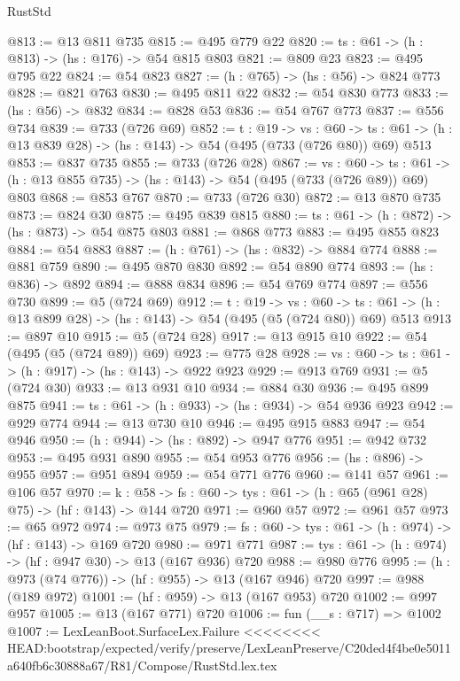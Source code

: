 \begin{lexlean}{RustStd}
\begin{coremodule}
{\begin{coremodule}
{{{{{@813 := @13 @811 @735
@815 := @495 @779 @22
@820 := {ts : @61} -> (h : @813) -> (hs : @176) -> @54 @815 @803
@821 := @809 @23
@823 := @495 @795 @22
@824 := @54 @823
@827 := (h : @765) -> (hs : @56) -> @824 @773
@828 := @821 @763
@830 := @495 @811 @22
@832 := @54 @830 @773
@833 := (hs : @56) -> @832
@834 := @828 @53
@836 := @54 @767 @773
@837 := @556 @734
@839 := @733 (@726 @69)
@852 := {t : @19} ->
  {vs : @60} ->
  {ts : @61} -> (h : @13 @839 @28) -> (hs : @143) -> @54 (@495 (@733 (@726 @80)) @69) @513
@853 := @837 @735
@855 := @733 (@726 @28)
@867 := {vs : @60} ->
  {ts : @61} -> (h : @13 @855 @735) -> (hs : @143) -> @54 (@495 (@733 (@726 @89)) @69) @803
@868 := @853 @767
@870 := @733 (@726 @30)
@872 := @13 @870 @735
@873 := @824 @30
@875 := @495 @839 @815
@880 := {ts : @61} -> (h : @872) -> (hs : @873) -> @54 @875 @803
@881 := @868 @773
@883 := @495 @855 @823
@884 := @54 @883
@887 := (h : @761) -> (hs : @832) -> @884 @774
@888 := @881 @759
@890 := @495 @870 @830
@892 := @54 @890 @774
@893 := (hs : @836) -> @892
@894 := @888 @834
@896 := @54 @769 @774
@897 := @556 @730
@899 := @5 (@724 @69)
@912 := {t : @19} ->
  {vs : @60} ->
  {ts : @61} -> (h : @13 @899 @28) -> (hs : @143) -> @54 (@495 (@5 (@724 @80)) @69) @513
@913 := @897 @10
@915 := @5 (@724 @28)
@917 := @13 @915 @10
@922 := @54 (@495 (@5 (@724 @89)) @69)
@923 := @775 @28
@928 := {vs : @60} -> {ts : @61} -> (h : @917) -> (hs : @143) -> @922 @923
@929 := @913 @769
@931 := @5 (@724 @30)
@933 := @13 @931 @10
@934 := @884 @30
@936 := @495 @899 @875
@941 := {ts : @61} -> (h : @933) -> (hs : @934) -> @54 @936 @923
@942 := @929 @774
@944 := @13 @730 @10
@946 := @495 @915 @883
@947 := @54 @946
@950 := (h : @944) -> (hs : @892) -> @947 @776
@951 := @942 @732
@953 := @495 @931 @890
@955 := @54 @953 @776
@956 := (hs : @896) -> @955
@957 := @951 @894
@959 := @54 @771 @776
@960 := @141 @57
@961 := @106 @57
@970 := {k : @58} ->
  {fs : @60} -> {tys : @61} -> (h : @65 (@961 @28) @75) -> (hf : @143) -> @144 @720
@971 := @960 @57
@972 := @961 @57
@973 := @65 @972
@974 := @973 @75
@979 := {fs : @60} -> {tys : @61} -> (h : @974) -> (hf : @143) -> @169 @720
@980 := @971 @771
@987 := {tys : @61} -> (h : @974) -> (hf : @947 @30) -> @13 (@167 @936) @720
@988 := @980 @776
@995 := (h : @973 (@74 @776)) -> (hf : @955) -> @13 (@167 @946) @720
@997 := @988 (@189 @972)
@1001 := (hf : @959) -> @13 (@167 @953) @720
@1002 := @997 @957
@1005 := @13 (@167 @771) @720
@1006 := fun (__s : @717) => @1002
@1007 := LexLeanBoot.SurfaceLex.Failure
<<<<<<<< HEAD:bootstrap/expected/verify/preserve/LexLeanPreserve/C20ded4f4be0e5011a640fb6c30888a67/R81/Compose/RustStd.lex.tex
}}}}}
\end{coremodule}}
\end{coremodule}
\end{lexlean}
